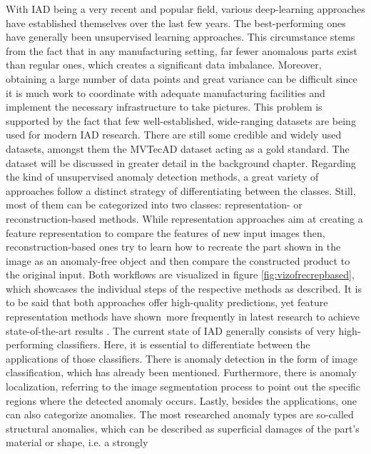 With IAD being a very recent and popular field, various deep-learning approaches have established themselves over 
the last few years. The best-performing ones have generally been unsupervised learning approaches. This circumstance stems from the fact that 
in any manufacturing setting, far fewer anomalous parts exist than regular ones, which creates a significant data imbalance. 
Moreover, obtaining a large number of data points and great variance can be difficult since it is much work to 
coordinate with adequate manufacturing facilities and implement the necessary infrastructure to take pictures. This problem is supported 
by the fact that few well-established, wide-ranging datasets are being used for modern IAD research. There are still some credible and widely used 
datasets, amongst them the MVTecAD \cite{MVTEC_Bergmann_2021} dataset acting as a gold standard. The dataset will be discussed in greater detail 
in the background chapter. Regarding the kind of unsupervised anomaly detection methods, a great variety of approaches follow a 
distinct strategy of differentiating between the classes. Still, most of them can be categorized into two classes: representation- 
or reconstruction-based methods. While representation approaches aim at creating a feature representation to compare the features of new input images then, reconstruction-based ones try to learn how to recreate the part shown in the image as an anomaly-free object and then compare the constructed product to the original input. Both workflows are visualized in figure \ref{fig:vizofrecrepbased}, which showcases 
the individual steps of the respective methods as described. It is to be said that both approaches offer high-quality predictions, yet 
feature representation methods have shown more frequently in latest research to achieve state-of-the-art results \cite{liu2024deep}. %
\newline
The current state of IAD generally consists of very high-performing classifiers. Here, it is essential to differentiate between the  
applications of those classifiers. There is anomaly detection in the form of image classification, which has already been mentioned. 
Furthermore, there is anomaly localization, referring to the image segmentation process to point out the specific regions where 
the detected anomaly occurs. Lastly, besides the applications, one can also categorize anomalies. The most researched anomaly types 
are so-called structural anomalies, which can be described as superficial damages of the part's material or shape, i.e. a strongly 
